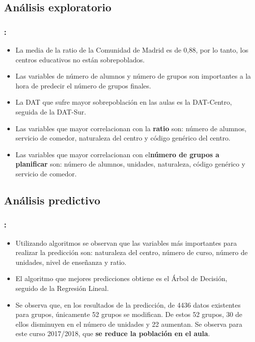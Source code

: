 \documentclass{beamer}
\begin{document}
\subsection{Análisis exploratorio}
\begin{frame}
\frametitle{\secname : \subsecname}
 \begin{itemize}
 	\item La media de la ratio de la Comunidad de Madrid es de 0,88, por lo tanto, los centros educativos no están sobrepoblados.
 	\item Las variables de número de alumnos y número de grupos son importantes a la hora de predecir el número de grupos finales.
 	\item La DAT que sufre mayor sobrepoblación en las aulas es la DAT-Centro, seguida de la DAT-Sur.
 	\item Las variables que mayor correlacionan con la \textbf{ratio} son: número de alumnos, servicio de comedor, naturaleza del centro y código genérico del centro.
 	\item Las variables que mayor correlacionan con el\textbf{número de grupos a planificar} son: número de alumnos, unidades, naturaleza, código genérico y servicio de comedor.
 \end{itemize}
 

\end{frame}
\subsection{Análisis predictivo}
\begin{frame}
\frametitle{\secname : \subsecname}
\begin{itemize}
	\item Utilizando algoritmos se observan que las variables más importantes para realizar la predicción son: naturaleza del centro, número de curso, número de unidades, nivel de enseñanza y ratio.
	\item El algoritmo que mejores predicciones obtiene es el Árbol de Decisión, seguido de la Regresión Lineal.
	\item Se observa que, en los resultados de la predicción, de 4436 datos existentes para grupos, únicamente 52 grupos se modifican. De estos 52 grupos, 30 de ellos disminuyen en el número de unidades y 22 aumentan. Se observa para este curso 2017/2018, que \textbf{se reduce la población en el aula}.
\end{itemize}

\end{frame}
\end{document}
